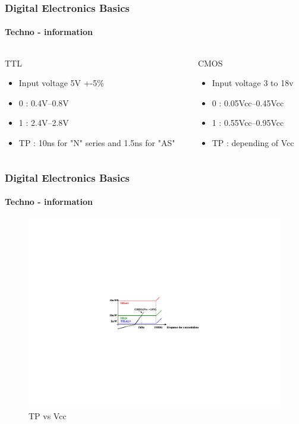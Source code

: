 \documentclass{beamer}
\begin{document}
\begin{frame}
  \frametitle{Digital Electronics Basics}
  \framesubtitle{Techno - information}


 \begin{columns}[t]
	 \begin{column}{5cm}
		\begin{block}{TTL}
			\begin{itemize}
				\item Input voltage 5V +-5\%
				\item 0 : 0.4V--0.8V
				\item 1 : 2.4V--2.8V
				\item TP : 10ns for "N" series and 1.5ns for "AS"
			\end{itemize}
		\end{block} 
	\end{column}
					   
	\begin{column}{5cm}
		\begin{block}{CMOS}
			\begin{itemize}
				\item Input voltage 3 to 18v
				\item 0 : 0.05Vcc--0.45Vcc 
				\item 1 : 0.55Vcc--0.95Vcc
				\item TP : depending of Vcc
			\end{itemize}
		\end{block}   
	\end{column}
\end{columns}  
\end{frame}

\begin{frame}
  \frametitle{Digital Electronics Basics}
  \framesubtitle{Techno - information}
    \begin{figure}
      \centering
      \includegraphics[width=\textwidth]{./images/cmos_tp.png}
      \caption{TP vs Vcc}
    \end{figure}
\end{frame}
\end{document}
